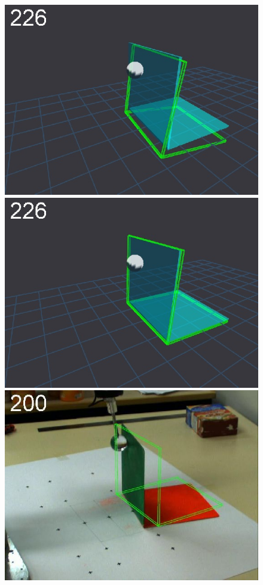 \begin{figure}[tb]
{\includegraphics[width=\imgBXwid]{./B1_2exp_20_3}
\includegraphics[width=\imgBXwid]{./B1_3exp_20_3}
\includegraphics[width=\imgBXwid]{./B2_2exp_58_3}
}
\end{figure}
